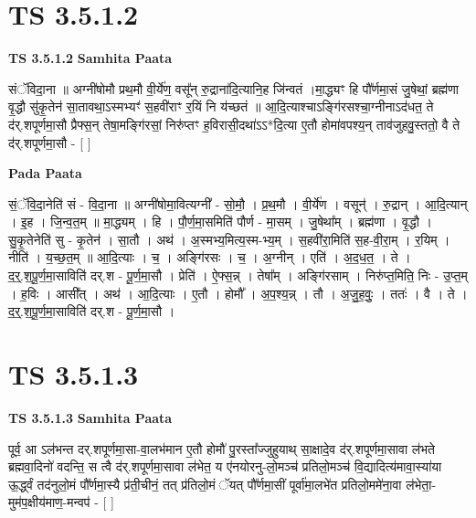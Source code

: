 \documentclass[17pt]{extarticle}
\begin{document}
\section*{ TS 3.5.1.2 }

\textbf{TS 3.5.1.2 } \newline
\textbf{Samhita Paata} \newline

संॅविदा॒ना ॥ अग्नी॑षोमौ प्रथ॒मौ वी॒र्ये॑ण॒ वसू᳚न् रु॒द्राना॑दि॒त्यानि॒ह जि॑न्वतं ।मा॒द्ध्यꣳ हि पौ᳚र्णमा॒सं जु॒षेथां॒ ब्रह्म॑णा वृ॒द्धौ सु॑कृ॒तेन॑ सा॒तावथा॒ऽस्मभ्यꣳ॑ स॒हवी॑राꣳ र॒यिं नि य॑च्छतं ॥ आ॒दि॒त्याश्चाऽङ्गि॑रसश्चा॒ग्नीनाऽद॑धत॒ ते द॑र्.शपूर्णमा॒सौ प्रैफ्स॒न् तेषा॒मङ्गि॑रसां॒ निरु॑प्तꣳ ह॒विरासी॒दथा॑ऽऽ*दि॒त्या ए॒तौ होमा॑वपश्य॒न् ताव॑जुहवु॒स्ततो॒ वै ते द॑र्.शपूर्णमा॒सौ - [  ] \newline

\textbf{Pada Paata} \newline

सं॒ॅवि॒दा॒नेति॑ सं - वि॒दा॒ना ॥ अग्नी॑षोमा॒वित्यग्नी᳚ - सो॒मौ॒ । प्र॒थ॒मौ । वी॒र्ये॑ण । वसून्॑ । रु॒द्रान् । आ॒दि॒त्यान् । इ॒ह । जि॒न्व॒त॒म् ॥ मा॒द्ध्यम् । हि । पौ॒र्ण॒मा॒समिति॑ पौर्ण - मा॒सम् । जु॒षेथा᳚म् । ब्रह्म॑णा । वृ॒द्धौ । सु॒कृ॒तेनेति॑ सु - कृ॒तेन॑ । सा॒तौ । अथ॑ । अ॒स्मभ्य॒मित्य॒स्म-भ्य॒म् । स॒हवी॑रा॒मिति॑ स॒ह-वी॒रा॒म् । र॒यिम् । नीति॑ । य॒च्छ॒त॒म् ॥ आ॒दि॒त्याः । च॒ । अङ्गि॑रसः । च॒ । अ॒ग्नीन् । एति॑ । अ॒द॒ध॒त॒ । ते । द॒र्॒.श॒पू॒र्ण॒मा॒साविति॑ दर्.श - पू॒र्ण॒मा॒सौ । प्रेति॑ । ऐ॒फ्स॒न्न् । तेषा᳚म् । अङ्गि॑रसाम् । निरु॑प्त॒मिति॒ निः - उ॒प्त॒म् । ह॒विः । आसी᳚त् । अथ॑ । आ॒दि॒त्याः । ए॒तौ । होमौ᳚ । अ॒प॒श्य॒न्न् । तौ । अ॒जु॒ह॒वुः॒ । ततः॑ । वै । ते । द॒र्॒.श॒पू॒र्ण॒मा॒साविति॑ दर्.श - पू॒र्ण॒मा॒सौ ।  \newline




\section*{ TS 3.5.1.3 }

\textbf{TS 3.5.1.3 } \newline
\textbf{Samhita Paata} \newline

पूर्व॒ आ ऽल॑भन्त दर्.शपूर्णमा॒सा-वा॒लभ॑मान ए॒तौ होमौ॑ पु॒रस्ता᳚ज्जुहुयाथ् सा॒क्षादे॒व द॑र्.शपूर्णमा॒सावा ल॑भते ब्रह्मवा॒दिनो॑ वदन्ति॒ स त्वै द॑र्.शपूर्णमा॒सावा ल॑भेत॒ य ए॑नयोरनु-लो॒मञ्च॑ प्रतिलो॒मञ्च॑ वि॒द्यादित्य॑मावा॒स्या॑या ऊ॒र्द्ध्वं तद॑नुलो॒मं पौ᳚र्णमा॒स्यै प्र॑ती॒चीनं॒ तत् प्र॑तिलो॒मं ॅयत् पौ᳚र्णमा॒सीं पूर्वा॑मा॒लभे॑त प्रतिलो॒ममे॑ना॒वा ल॑भेता॒-मुम॑प॒क्षीय॑माण॒-मन्वप॑ - [  ] \newline
\end{document}
